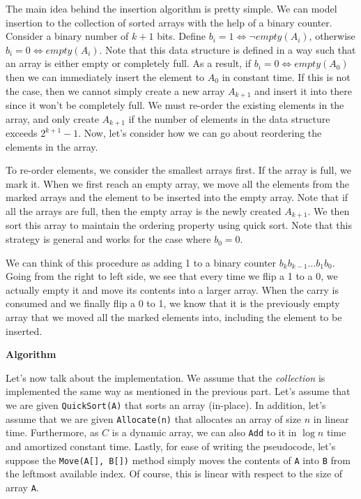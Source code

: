 \documentclass{article}
\begin{document}
The main idea behind the insertion algorithm is pretty simple. We can model insertion to the collection of sorted
arrays with the help of a binary counter. Consider a binary number of $k + 1$ bits.
Define $b_i = 1 \Leftrightarrow \neg empty(A_i)$, otherwise $b_i = 0 \Leftrightarrow empty(A_i)$.
Note that this data structure is defined in a way such that an array is either empty or completely full. As a result,
if $b_i = 0 \Leftrightarrow empty(A_0)$ then we can immediately insert the element to $A_0$ in constant time. If this
is not the case, then we cannot simply create a new array $A_{k+1}$ and insert it into there since it won't be
completely full. We must re-order the existing elements in the array, and only create $A_{k+1}$ if the number
of elements in the data structure exceeds $2^{k+1} - 1$. Now, let's consider how we can go about reordering the
elements in the array.

To re-order elements, we consider the smallest arrays first. If the array is full, we mark it. When we first reach
an empty array, we move all the elements from the marked arrays and the element to be inserted into the empty array.
Note that if all the arrays are full, then the empty array is the newly created $A_{k+1}$. We then sort this array
to maintain the ordering property using quick sort. Note that this strategy is general and works for the case
where $b_0 = 0$.

We can think of this procedure as adding 1 to a binary counter $b_{k}b_{k-1} \ldots b_{1}b_{0}$. Going from the right
to left side, we see that every time we flip a 1 to a 0, we actually empty it and move its contents into a larger array.
When the carry is consumed and we finally flip a 0 to 1, we know that it is the previously empty array that we moved
all the marked elements into, including the element to be inserted.
\newline

\textbf{Algorithm}

Let's now talk about the implementation. We assume that the \textit{collection} is implemented the same way
as mentioned in the previous part.
Let's assume that we are given \texttt{QuickSort(A)} that sorts an array (in-place). In addition, let's assume
that we are given \texttt{Allocate(n)} that allocates an array of size $n$ in linear time. Furthermore, as $C$ is a
dynamic array, we can also \texttt{Add} to it in $\log n$ time and amortized constant time.
Lastly, for ease of writing the pseudocode, let's suppose the \texttt{Move(A[], B[])} method simply moves the contents
of \texttt{A} into \texttt{B} from the leftmost available index. Of course, this is linear with respect to the
size of array \texttt{A}.
\end{document}
